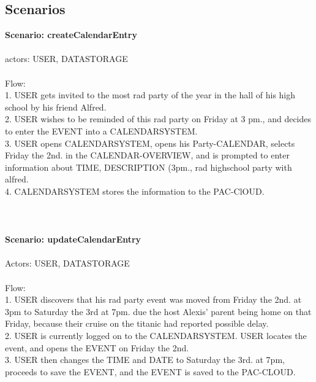 \subsection{Scenarios}

\textbf{Scenario: createCalendarEntry}\\
\HRule \\[0.4cm]
actors: USER, DATASTORAGE\\
\HRule \\[0.4cm]
Flow: \\
1. USER gets invited to the most rad party of the year in the hall of his high school by his friend Alfred.\\
2. USER wishes to be reminded of this rad party on Friday at 3 pm., and decides to enter the EVENT into a CALENDARSYSTEM.\\
3. USER opens CALENDARSYSTEM, opens his Party-CALENDAR, selects Friday the 2nd. in the CALENDAR-OVERVIEW, and is prompted to enter information about TIME, DESCRIPTION (3pm., rad highschool party with alfred.\\
4. CALENDARSYSTEM stores the information to the PAC-ClOUD.\\\HRule \\[0.4cm]\\\\
\textbf{Scenario: updateCalendarEntry}\\
\HRule \\[0.4cm]
Actors: USER, DATASTORAGE\\
\HRule \\[0.4cm]
Flow:\\
1. USER discovers that his rad party event was moved from Friday the 2nd. at 3pm to Saturday the 3rd at 7pm. due the host Alexis' parent being home on that Friday, because their cruise on the titanic had reported possible delay.\\
2. USER is currently logged on to the CALENDARSYSTEM. USER locates the event, and opens the EVENT on Friday the 2nd.\\
3. USER then changes the TIME and DATE to Saturday the 3rd. at 7pm, proceeds to save the EVENT, and the EVENT is saved to the PAC-CLOUD.\\
\HRule \\[0.4cm]
\newpage